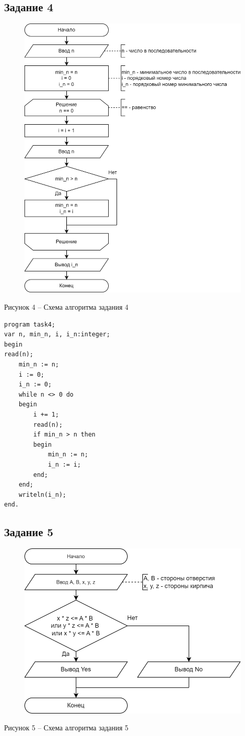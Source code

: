 \documentclass[a4paper,14pt]{extarticle}
\begin{document}
	\subsection*{Задание 4}
	\begin{figure}[h]
		\centering
		\includegraphics[width=0.6\linewidth]{schemes/t-4}
	\end{figure}
	\begin{center}
		Рисунок 4 – Схема алгоритма задания 4
	\end{center}
	
	\begin{lstlisting}
program task4;
var n, min_n, i, i_n:integer;
begin
read(n);
    min_n := n;
    i := 0;
    i_n := 0;
    while n <> 0 do
    begin
        i += 1;
        read(n);
        if min_n > n then
        begin
            min_n := n;
            i_n := i;
        end;
    end;
    writeln(i_n);
end.
	\end{lstlisting}
	
	\subsection*{Задание 5}
	\begin{figure}[h]
		\centering
		\includegraphics[width=0.6\linewidth]{schemes/t-5}
	\end{figure}
	\begin{center}
		Рисунок 5 – Схема алгоритма задания 5
	\end{center}
\end{document}
